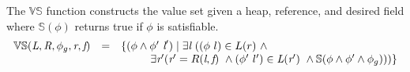 \begin{definition}
\label{def:VS}
The $\mathbb{VS}$ function constructs the value set given a
heap, reference, and desired field where $\mathbb{S}(\phi)$ returns true if $\phi$ is satisfiable.
\[
\begin{array}{rcl}
  \mathbb{VS}(\emph{L},\emph{R},\phi_g,\emph{r},\emph{f}) & = &
  \{(\phi\wedge\phi^\prime\ \emph{l}^\prime) \mid \exists
  \emph{l}\ ((\phi\ l) \in L(r)\ \wedge \\ & &
  \ \ \ \ \ \ \ \ \exists \emph{r}^\prime ( \emph{r}^\prime =
  R(\emph{l},\emph{f})\ \wedge (\phi^\prime\ l^\prime) \in
  \emph{L}(\emph{r}^\prime)\ \wedge
  \mathbb{S}(\phi\wedge\phi^\prime\wedge \phi_g)))\}
\end{array}
\]
\end{definition}
